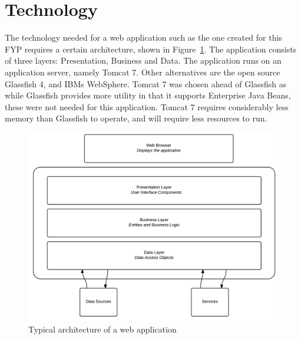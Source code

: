 \section{Technology}

The technology needed for a web application such as the one created for this FYP requires a certain architecture, shown in Figure~\ref{fig:webarch}. The application consists of three layers: Presentation, Business and Data. The application runs on an application server, namely Tomcat 7. Other alternatives are the open source Glassfish 4, and IBMs WebSphere. Tomcat 7 was chosen ahead of Glassfish as while Glassfish provides more utility in that it supports Enterprise Java Beans, these were not needed for this application. Tomcat 7 requires considerably less memory than Glassfish to operate, and will require less resources to run. 

\begin{figure}[H]
\begin{center}
\includegraphics[scale=0.24]{webapp.PNG}
\end{center}
\caption{Typical architecture of a web application}
\label{fig:webarch}
\end{figure}

